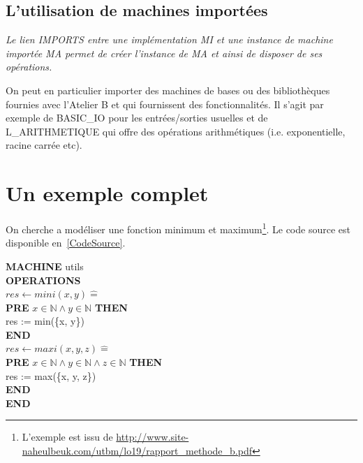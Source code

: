 \documentclass[10pt,a4paper]{article}
\newcommand{\Bequal}{\mathrel{\widehat{=}}}
\begin{document}
{\subsection{L'utilisation de machines importées}

\emph{Le lien IMPORTS entre une implémentation MI et une instance de machine importée MA permet de créer l'instance de MA et ainsi de disposer de ses opérations.\cite{habrias2006specifications}}

On peut en particulier importer des machines de bases ou des bibliothèques fournies avec l'Atelier B et qui fournissent des fonctionnalités. Il s'agit par exemple de BASIC\_IO pour les entrées/sorties usuelles et de L\_ARITHMETIQUE qui offre des opérations arithmétiques (i.e. exponentielle, racine carrée etc).

\section{Un exemple complet}
\label{ExempleComplet}
On cherche a modéliser une fonction minimum et maximum\footnote{L'exemple est issu de \url{http://www.site-naheulbeuk.com/utbm/lo19/rapport_methode_b.pdf}}.
Le code source est disponible en~\cref{CodeSource}.

\noindent \textbf{MACHINE} utils \\
\textbf{OPERATIONS} \\
$res \leftarrow mini(x, y) \Bequal$ \\
\hspace*{1em}  \textbf{PRE} $x \in \mathbb{N} \wedge  y \in \mathbb{N} $ \textbf{THEN} \\
\hspace*{2em} res := min(\{x, y\})  \\
\hspace*{1em} \textbf{END} \\
$res \leftarrow maxi(x, y, z) \Bequal$ \\
\hspace*{1em}  \textbf{PRE} $x \in \mathbb{N} \wedge  y \in \mathbb{N} \wedge z \in \mathbb{N}$ \textbf{THEN} \\
\hspace*{2em} res := max(\{x, y, z\})  \\
\hspace*{1em} \textbf{END} \\
\textbf{END}

}
\end{document}
